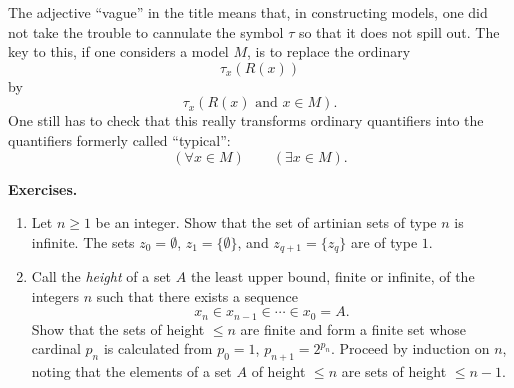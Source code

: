 \documentclass[11pt]{article}
\newenvironment{remarktext}[1]{\par\medskip\noindent\textbf{#1.}\ }{\par\medskip}
\begin{document}
The adjective ``vague'' in the title means that, in constructing models, one did not take the trouble to cannulate the symbol \(\tau\) so that it does not spill out. The key to this, if one considers a model \(M\), is to replace the ordinary
\[
 \tau_x(R(x))
\]
by
\[
 \tau_x(R(x)\text{ and }x\in M).
\]
One still has to check that this really transforms ordinary quantifiers into the quantifiers formerly called ``typical'':
\[
 (\forall x\in M)\qquad (\exists x\in M).
\]

\begin{remarktext}{Exercises}
\begin{enumerate}[label=\arabic*)]
\item Let \(n\geq1\) be an integer. Show that the set of artinian sets of type \(n\) is infinite. The sets \(z_0=\emptyset\), \(z_1=\{\emptyset\}\), and \(z_{q+1}=\{z_q\}\) are of type \(1\).

\item Call the \emph{height} of a set \(A\) the least upper bound, finite or infinite, of the integers \(n\) such that there exists a sequence
\[
 x_n\in x_{n-1}\in\cdots\in x_0=A.
\]
Show that the sets of height \(\leq n\) are finite and form a finite set whose cardinal \(p_n\) is calculated from \(p_0=1\), \(p_{n+1}=2^{p_n}\). Proceed by induction on \(n\), noting that the elements of a set \(A\) of height \(\leq n\) are sets of height \(\leq n-1\).


\end{enumerate}
\end{remarktext}
\end{document}
